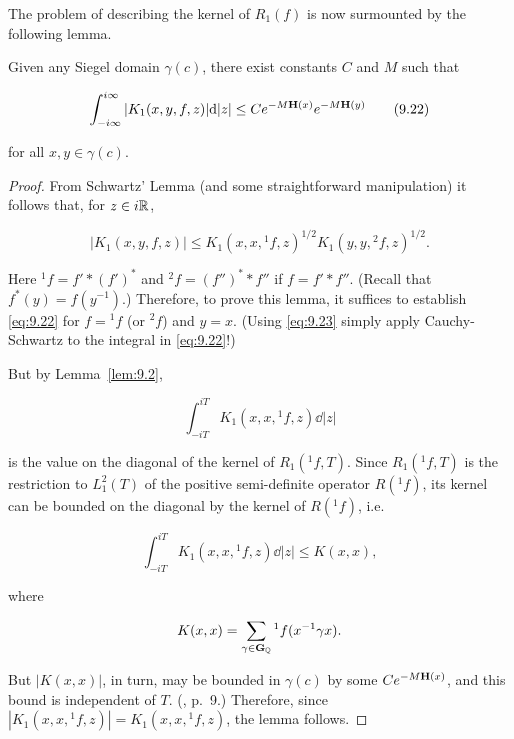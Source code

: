 The problem of describing the kernel of $R_1(f)$ is now surmounted by the following lemma.

\begin{lemma}\label{lem:9.3}

Given any Siegel domain $\gamma(c)$, there exist constants $C$ and $M$ such that

\begin{equation}\label{eq:9.22}
\int_{-i\infty}^{i\infty} |K_1(x, y, f, z)|\mathrm{d}|z| \leq Ce^{-M\mathbf{H}(x)}e^{-M\mathbf{H}(y)}\tag{9.22}
\end{equation}

for all $x, y \in \gamma(c)$.

\end{lemma}

\begin{proof}

From Schwartz' Lemma (and some straightforward manipulation) it follows that, for $z \in i\mathbb{R}$,

\begin{equation}\label{eq:9.23}
|K_1(x, y, f, z)| \leq K_1(x, x, {}^{1}f, z)^{1/2}K_1(y, y, {}^{2}f, z)^{1/2}.\tag{9.23}
\end{equation}

Here ${}^{1}f = f' * (f')^{*}$ and ${}^{2}f = (f'')^{*} * f''$ if $f = f' * f''$. (Recall that $f^{*}(y) = f(y^{-1})$.) Therefore, to prove this lemma, it suffices to establish \eqref{eq:9.22} for $f = {}^{1}f$ (or ${}^{2}f$) and $y = x$. (Using \eqref{eq:9.23} simply apply Cauchy-Schwartz to the integral in \eqref{eq:9.22}!)

But by Lemma~\ref{lem:9.2},

\[
\int_{-iT}^{iT} K_1(x, x, {}^{1}f, z)\dd|z|
\]

is the value on the diagonal of the kernel of $R_1({}^{1}f, T)$. Since $R_1({}^{1}f, T)$ is the restriction to $L_1^2(T)$ of the positive semi-definite operator $R({}^{1}f)$, its kernel can be bounded on the diagonal by the kernel of $R({}^{1}f)$, i.e.

\[
\int_{-iT}^{iT} K_1(x, x, {}^{1}f, z)\dd|z| \leq K(x, x),
\]

where

\[
K(x, x) = \sum_{\gamma \in \mathbf{G}_{\mathbb{Q}}} {}^{1}f(x^{-1}\gamma x).
\]

But $|K(x,x)|$, in turn, may be bounded in $\gamma(c)$ by some $Ce^{-M\mathbf{H}(x)}$, and this bound is independent of $T$. (\cite{HarishChandra2}, p.~9.) Therefore, since $|K_1(x,x,{}^{1}f,z)| = K_1(x,x,{}^{1}f,z)$, the lemma follows.

\end{proof}

